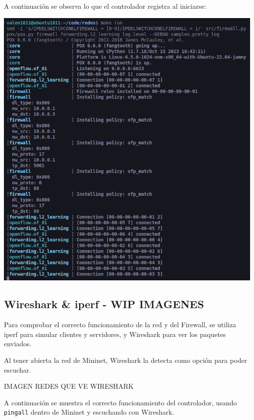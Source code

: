 \documentclass{article}
\begin{document}
A continuación se observa lo que el controlador registra al iniciarse:
\begin{center}
 \includegraphics[scale=0.45]{pox_init.png}
\end{center}

\subsection{Wireshark \& iperf - WIP IMAGENES}\label{wireshark-iperf}

Para comprobar el correcto funcionamiento de la red y del Firewall, se utiliza iperf para simular clientes y servidores, y Wireshark para ver los paquetes enviados.

Al tener abierta la red de Mininet, Wireshark la detecta como opción para poder escuchar.

IMAGEN REDES QUE VE WIRESHARK
\begin{center}
\end{center}

A continuación se muestra el correcto funcionamiento del controlador, usando \texttt{pingall} dentro de Mininet y escuchando con Wireshark.
\end{document}
